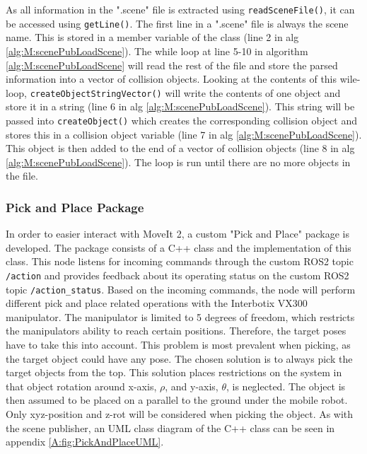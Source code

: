 As all information in the ".scene" file is extracted using \lstinline{readSceneFile()}, it can be accessed using \lstinline{getLine()}. The first line in a ".scene" file is always the scene name. This is stored in a member variable of the class (line 2 in alg \ref{alg:M:scenePubLoadScene}). The while loop at line 5-10 in algorithm \ref{alg:M:scenePubLoadScene} will read the rest of the file and store the parsed information into a vector of collision objects. Looking at the contents of this wile-loop, \lstinline{createObjectStringVector()} will write the contents of one object and store it in a string (line 6 in alg \ref{alg:M:scenePubLoadScene}). This string will be passed into \lstinline{createObject()} which creates the corresponding collision object and stores this in a collision object variable (line 7 in alg \ref{alg:M:scenePubLoadScene}). This object is then added to the end of a vector of collision objects (line 8 in alg \ref{alg:M:scenePubLoadScene}). The loop is run until there are no more objects in the file. 



\subsubsection{Pick and Place Package} \label{sec:M:A:HuskyPickAndPlace}
In order to easier interact with MoveIt 2, a custom "Pick and Place" package is developed. The package consists of a C++ class and the implementation of this class. This node listens for incoming commands through the custom ROS2 topic \lstinline{/action} and provides feedback about its operating status on the custom ROS2 topic \lstinline{/action_status}. Based on the incoming commands, the node will perform different pick and place related operations with the Interbotix VX300 manipulator. The manipulator is limited to 5 degrees of freedom, which restricts the manipulators ability to reach certain positions. Therefore, the target poses have to take this into account. This problem is most prevalent when picking, as the target object could have any pose.
The chosen solution is to always pick the target objects from the top. This solution places restrictions on the system in that object rotation around x-axis, $\rho$, and y-axis, $\theta$, is neglected. The object is then assumed to be placed on a parallel to the ground under the mobile robot. Only xyz-position and z-rot will be considered when picking the object. As with the scene publisher, an UML class diagram of the C++ class can be seen in appendix \ref{A:fig:PickAndPlaceUML}.

